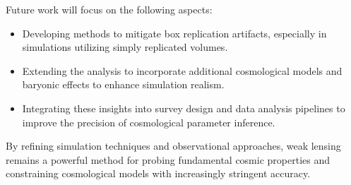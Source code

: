 
Future work will focus on the following aspects:
\begin{itemize} 
    \item Developing methods to mitigate box replication artifacts, especially in simulations utilizing simply replicated volumes. 
    \item Extending the analysis to incorporate additional cosmological models and baryonic effects to enhance simulation realism. 
    \item Integrating these insights into survey design and data analysis pipelines to improve the precision of cosmological parameter inference. 
\end{itemize}

By refining simulation techniques and observational approaches, weak lensing remains a powerful method for probing fundamental cosmic properties and constraining cosmological models with increasingly stringent accuracy. 